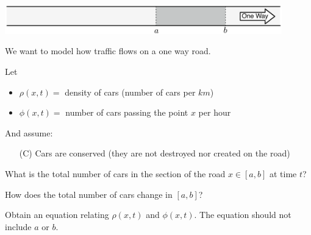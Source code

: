 \documentclass{workbook}
\begin{document}
\begin{slide}

\question

\begin{problem}
\begin{center}
\includegraphics[width=0.9\textwidth]{images/road-long.pdf}
\end{center}
We want to model how traffic flows on a one way road.
\end{problem}

Let
\begin{itemize}
\item $\rho(x,t) = $ density of cars (number of cars per $km$) %
\item $\phi(x,t) = $ number of cars passing the point $x$ per hour %
\end{itemize}

And assume:
\begin{itemize}
	\item[(C)] Cars are conserved (they are not destroyed nor created on the road)
\end{itemize}

\begin{parts}
\item What is the total number of cars in the section of the road $x \in [a,b]$ at time $t$?

\item How does the total number of cars change in $[a,b]$?


\item Obtain an equation relating $\rho(x,t)$ and $\phi(x,t)$. The equation should not include $a$ or $b$.	

\end{parts}


\end{slide}
\end{document}
